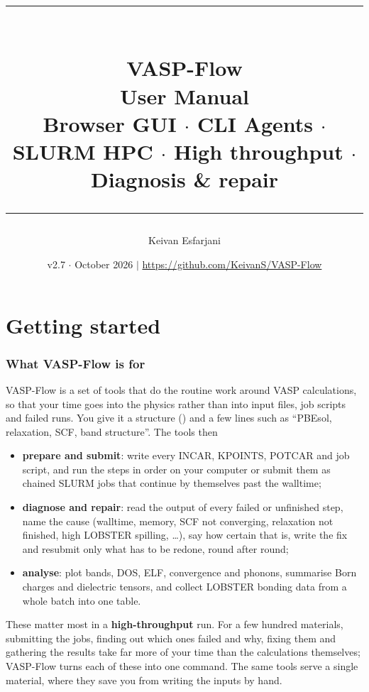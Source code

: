 \documentclass[11pt,a4paper]{scrartcl}
\title{%
  \vspace*{-10pt}%
  {\color{mainblue}\rule{\linewidth}{2pt}}\\[8pt]%
  \textbf{\Huge VASP-Flow}\\[4pt]%
  \large User Manual\\[6pt]%
  \normalsize Browser GUI $\cdot$ CLI Agents $\cdot$ SLURM HPC $\cdot$ High throughput $\cdot$ Diagnosis \& repair\\[6pt]%
  {\color{mainblue}\rule{\linewidth}{0.5pt}}%
}
\author{Keivan Esfarjani}
\date{v2.7 $\cdot$ October 2026 \quad\textcolor{mainblue}{$|$}\quad
      \url{https://github.com/KeivanS/VASP-Flow}}
\newcommand{\cmd}[1]{\texttt{\detokenize{#1}}}
\begin{document}
\sloppy

\maketitle
\setcounter{tocdepth}{2}
\tableofcontents
\newpage
\part{Getting started}
\label{part:start}

\section{What VASP-Flow is for}
\label{sec:what}

VASP-Flow is a set of tools that do the routine work around VASP calculations, so that your
time goes into the physics rather than into input files, job scripts and failed runs.  You give
it a structure (\cmd{POSCAR}) and a few lines such as ``PBEsol, relaxation, SCF, band
structure''.  The tools then
\begin{itemize}
  \item \textbf{prepare and submit}: write every INCAR, KPOINTS, POTCAR and job script, and run
        the steps in order on your computer or submit them as chained SLURM jobs that continue
        by themselves past the walltime;
  \item \textbf{diagnose and repair}: read the output of every failed or unfinished step, name
        the cause (walltime, memory, SCF not converging, relaxation not finished, high LOBSTER
        spilling, \ldots), say how certain that is, write the fix and resubmit only what has to
        be redone, round after round;
  \item \textbf{analyse}: plot bands, DOS, ELF, convergence and phonons, summarise Born charges
        and dielectric tensors, and collect LOBSTER bonding data from a whole batch into one
        table.
\end{itemize}
These matter most in a \textbf{high-throughput} run.  For a few hundred materials, submitting
the jobs, finding out which ones failed and why, fixing them and gathering the results take far
more of your time than the calculations themselves; VASP-Flow turns each of these into one
command.  The same tools serve a single material, where they save you from writing the inputs
by hand.
\end{document}
